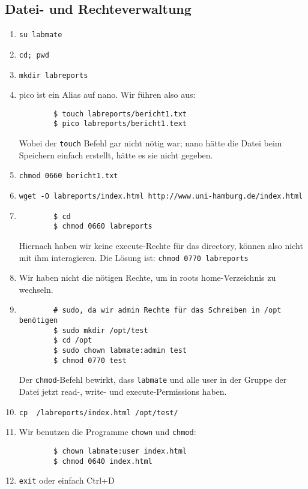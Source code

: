 \documentclass[12pt,a4paper]{article}
\begin{document}
\subsection{Datei- und Rechteverwaltung}
\begin{enumerate}
    \item \texttt{su labmate}
    \item \texttt{cd; pwd}
    \item \texttt{mkdir labreports}
    \item pico ist ein Alias auf nano. Wir führen also aus:
        \begin{verbatim}
        $ touch labreports/bericht1.txt
        $ pico labreports/bericht1.text
        \end{verbatim}
        Wobei der \texttt{touch} Befehl gar nicht nötig war; nano hätte die Datei beim Speichern einfach erstellt, hätte es sie nicht gegeben.
    \item \texttt{chmod 0660 bericht1.txt}
    \item \texttt{wget -O labreports/index.html http://www.uni-hamburg.de/index.html}
    \item
        \begin{verbatim}
        $ cd
        $ chmod 0660 labreports
        \end{verbatim}
        Hiernach haben wir keine execute-Rechte für das directory, können also
        nicht mit ihm interagieren. Die Lösung ist:
        \texttt{chmod 0770 labreports}
    \item Wir haben nicht die nötigen Rechte, um in roots home-Verzeichnis zu wechseln.
    \item
        \begin{verbatim}
        # sudo, da wir admin Rechte für das Schreiben in /opt benötigen
        $ sudo mkdir /opt/test
        $ cd /opt
        $ sudo chown labmate:admin test
        $ chmod 0770 test
        \end{verbatim}
        Der \texttt{chmod}-Befehl bewirkt, dass \texttt{labmate} und alle user in
        der Gruppe der Datei jetzt read-, write- und execute-Permissions haben.
    \item \texttt{cp ~/labreports/index.html /opt/test/}
    \item Wir benutzen die Programme \texttt{chown} und \texttt{chmod}:
        \begin{verbatim}
        $ chown labmate:user index.html
        $ chmod 0640 index.html
        \end{verbatim}
    \item \texttt{exit} oder einfach Ctrl+D

\end{enumerate}
\end{document}
